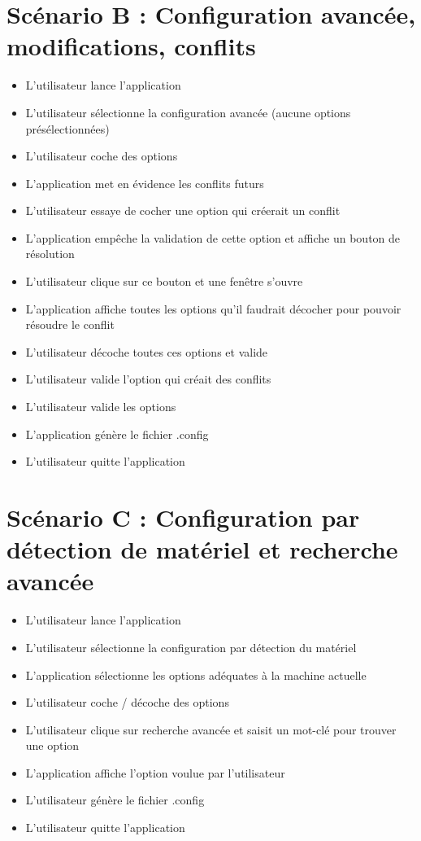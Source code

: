 \documentclass[16pts]{report}
\begin{document}
\section{Scénario B : Configuration avancée, modifications, conflits}
\label{sec:Scénario B : Configuration avancée, modifications, conflits}

\begin{itemize}
    \item L'utilisateur lance l'application
    \item L'utilisateur sélectionne la configuration avancée (aucune options
        présélectionnées)
    \item L'utilisateur coche des options
    \item L'application met en évidence les conflits futurs
    \item L'utilisateur essaye de cocher une option qui créerait un conflit
    \item L'application empêche la validation de cette option et affiche un
        bouton de résolution
    \item L'utilisateur clique sur ce bouton et une fenêtre s'ouvre
    \item L'application affiche toutes les options qu'il faudrait décocher pour
        pouvoir résoudre le conflit
    \item L'utilisateur décoche toutes ces options et valide
    \item L'utilisateur valide l'option qui créait des conflits
    \item L'utilisateur valide les options
    \item L'application génère le fichier .config
    \item L'utilisateur quitte l'application
\end{itemize}

\pagebreak

\section{Scénario C : Configuration par détection de matériel et recherche avancée}
\label{sec:Scénario C : Configuration par détection de matériel et recherche avancée}

\begin{itemize}
    \item L'utilisateur lance l'application
    \item L'utilisateur sélectionne la configuration par détection du matériel
    \item L'application sélectionne les options adéquates à la machine actuelle
    \item L'utilisateur coche / décoche des options
    \item L'utilisateur clique sur recherche avancée et saisit un mot-clé pour
        trouver une option
    \item L'application affiche l'option voulue par l'utilisateur
    \item L'utilisateur génère le fichier .config
    \item L'utilisateur quitte l'application
\end{itemize}
\end{document}
